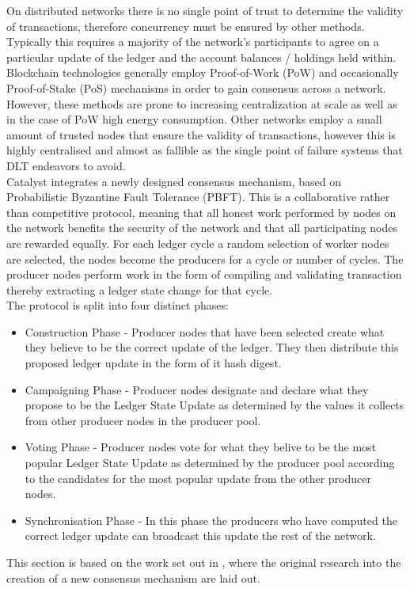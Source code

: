 On distributed networks there is no single point of trust to determine the validity of transactions, therefore concurrency must be ensured by other methods. Typically this requires a majority of the network's participants to agree on a particular update of the ledger and the account balances / holdings held within. Blockchain technologies generally employ Proof-of-Work (PoW) and occasionally Proof-of-Stake (PoS) mechanisms in order to gain consensus across a network. However, these methods are prone to increasing centralization at scale as well as in the case of PoW high energy consumption. Other networks employ a small amount of trusted nodes that ensure the validity of transactions, however this is highly centralised and almost as fallible as the single point of failure systems that DLT endeavors to avoid. \\

Catalyst integrates a newly designed consensus mechanism, based on Probabilistic Byzantine Fault Tolerance (PBFT).  This is a collaborative rather than competitive protocol, meaning that all honest work performed by nodes on the network benefits the security of the network and that all participating nodes are rewarded equally. For each ledger cycle a random selection of worker nodes are selected, the nodes become the producers for a cycle or number of cycles. The producer nodes perform work in the form of compiling and validating transaction thereby extracting a ledger state change for that cycle. \\


The protocol is split into four distinct phases:

\begin{itemize}

\item Construction Phase - Producer nodes that have been selected create what they believe to be the correct update of the ledger. They then distribute this proposed ledger update in the form of it hash digest.
\item Campaigning Phase - Producer nodes designate and declare what they propose to be the Ledger State Update as determined by the values it collects from other producer nodes in the producer pool.
\item Voting Phase - Producer nodes vote for what they belive to be the most popular Ledger State Update as determined by the producer pool according to the candidates for the most popular update from the other producer nodes.
\item Synchronisation Phase - In this phase the producers who have computed the correct ledger update can broadcast this update the rest of the network.

\end{itemize}

This section is based on the work set out in \cite{catalystresearch}, where the original research into the creation of a new consensus mechanism are laid out.